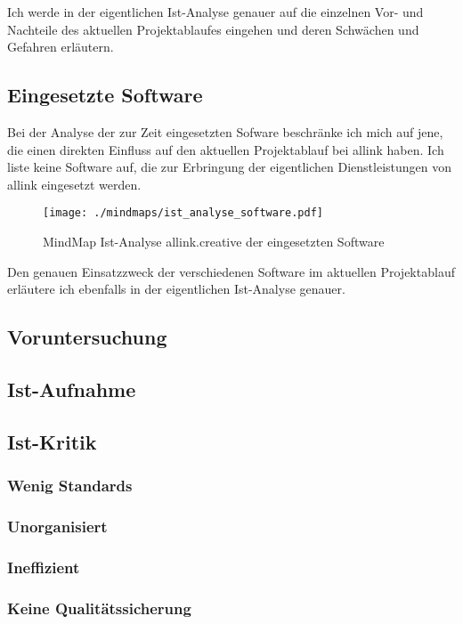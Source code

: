Ich werde in der eigentlichen Ist-Analyse genauer auf die einzelnen Vor- und
Nachteile des aktuellen Projektablaufes eingehen und deren Schwächen und 
Gefahren erläutern.

\subsection{Eingesetzte Software}
Bei der Analyse der zur Zeit eingesetzten Sofware beschränke ich mich auf jene,
die einen direkten Einfluss auf den aktuellen Projektablauf bei allink haben.
Ich liste keine Software auf, die zur Erbringung der eigentlichen Dienstleistungen
von allink eingesetzt werden.

\begin{figure}[htbp]
\begin{center}
\texttt{[image: ./mindmaps/ist\_analyse\_software.pdf]}
\caption{MindMap Ist-Analyse allink.creative der eingesetzten Software}
\label{pic:ist_analyse_software}
\end{center}
\end{figure}

Den genauen Einsatzzweck der verschiedenen Software im aktuellen Projektablauf
erläutere ich ebenfalls in der eigentlichen Ist-Analyse genauer.

\subsection{Voruntersuchung}
\subsection{Ist-Aufnahme}
\subsection{Ist-Kritik}
\subsubsection{Wenig Standards}
\subsubsection{Unorganisiert}
\subsubsection{Ineffizient}
\subsubsection{Keine Qualitätssicherung}
